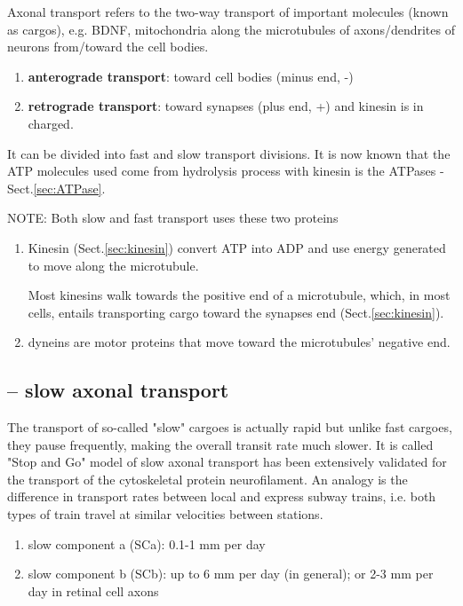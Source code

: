 Axonal transport refers to the two-way transport of important molecules (known
as cargos), e.g. BDNF, mitochondria along the microtubules of axons/dendrites of
neurons from/toward the cell bodies.
\begin{enumerate}
  \item {\bf anterograde transport}: toward cell bodies (minus end, -)
  \item {\bf retrograde transport}: toward synapses (plus end, +) and kinesin is
  in charged.
\end{enumerate}
It can be divided into fast and slow transport divisions.
It is now known that the ATP molecules used come from hydrolysis process with
kinesin is the ATPases - Sect.\ref{sec:ATPase}.

NOTE: Both slow and fast transport uses these two proteins
\begin{enumerate}
  \item Kinesin (Sect.\ref{sec:kinesin}) convert ATP into ADP and use energy
  generated to move along the microtubule.

Most kinesins walk towards the positive end of a microtubule, which, in most
cells, entails transporting cargo toward the synapses end
(Sect.\ref{sec:kinesin}).

  \item dyneins are motor proteins that move toward the microtubules' negative
  end.
\end{enumerate}

\subsection{-- slow axonal transport}

The transport of so-called "slow" cargoes is actually rapid but unlike fast
cargoes, they pause frequently, making the overall transit rate much slower.
It is called "Stop and Go" model of slow axonal transport has been extensively
validated for the transport of the cytoskeletal protein neurofilament.
An analogy is the difference in transport rates between local and express subway
trains, i.e.  both types of train travel at similar velocities between stations.
\begin{enumerate}
  \item slow component a (SCa): 0.1-1 mm per day

  \item slow component b (SCb): up to 6 mm per day (in general); or 2-3 mm per
  day in retinal cell axons
\end{enumerate}


